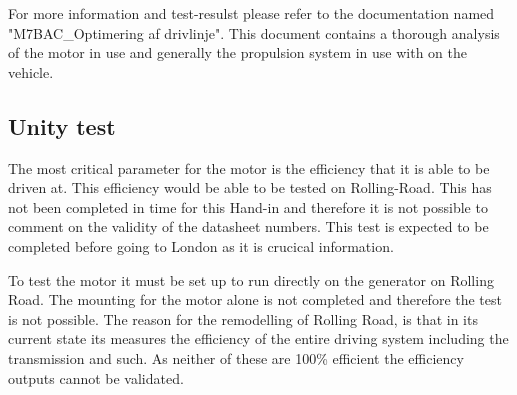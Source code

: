 For more information and test-resulst please refer to the documentation named "M7BAC\_Optimering af drivlinje". This document contains a thorough analysis of the motor in use and generally the propulsion system in use with on the vehicle.  

\subsection{Unity test}
The most critical parameter for the motor is the efficiency that it is able to be driven at. This efficiency would be able to be tested on Rolling-Road. This has not been completed in time for this Hand-in and therefore it is not possible to comment on the validity of the datasheet numbers. This test is expected to be completed before going to London as it is crucical information. 

To test the motor it must be set up to run directly on the generator on Rolling Road. The mounting for the motor alone is not completed and therefore the test is not possible. The reason for the remodelling of Rolling Road, is that in its current state its measures the efficiency of the entire driving system including the transmission and such. As neither of these are 100\% efficient the efficiency outputs cannot be validated. 